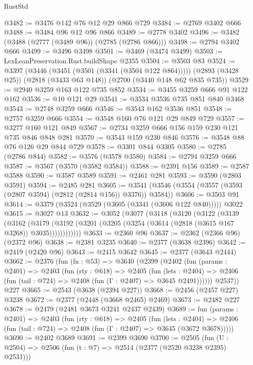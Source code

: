 \begin{lexlean}{RustStd}
\begin{coremodule}
@3482 := @3476 @142 @76 @12 @29 @866 @729
@3484 := @2769 @3402 @666
@3488 := @3484 @96 @12 @96 @866
@3489 := @2778 @3402
@3496 := @3482 (@3488 (@2777 (@3489 @96)) (@2785 (@2786 @866)))
@3498 := @2794 @3402 @666
@3499 := @3496 @3498
@3501 := @3469 (@3474 @3499)
@3503 := LexLeanPreservation.Rust.buildShape @2355
@3504 := @3503 @83
@3524 := @3397
    (@3446 (@3451 (@3501 (@3341 (@3504 @122 @864)))))
    (@2893 (@3428 @25))
    (@2818 (@3433 @63 @148))
    (@2700 (@3440 @148 @62 @835 @735))
@3529 := @2940 @3259 @163 @122 @735 @852
@3534 := @3455 @3259 @666 @91 @122 @162
@3536 := @10 @121 @29
@3541 := @3534 @3536 @735 @851 @840 @3468
@3543 := @2748 @3259 @666
@3546 := @3543 @162 @3536 @851
@3548 := @2757 @3259 @666
@3554 := @3548 @160 @76 @121 @29 @849 @729
@3557 := @3277 @160 @121 @849
@3567 := @2734 @3259 @666 @156 @159 @230 @121 @735 @846 @848 @281
@3570 := @3543 @159 @230 @846
@3576 := @3548 @88 @76 @126 @29 @844 @729
@3578 := @3301 @844 @3305
@3580 := @2785 (@2786 @844)
@3582 := @3576 (@3578 @3580)
@3584 := @2794 @3259 @666
@3587 := @3567 (@3570 (@3582 @3584))
@3588 := @2391 @156
@3589 := @2587 @3588
@3590 := @3587 @3589
@3591 := @2461 @281
@3593 := @3590 (@2803 @3591)
@3594 := @2485 @281
@3605 := @3541 (@3546 (@3554 (@3557 (@3593 (@2807 @3594) (@2812 (@2814 @156)) @3376)) @3584))
@3606 := @3503 @91
@3614 := @3379 (@3524 (@3529 (@3605 (@3341 (@3606 @122 @840))))) @3022
@3615 := @3027 @13
@3632 := @3052
    (@3077
      (@3118
        (@3120
          (@3122
            (@3139
              (@3162
                (@3179
                  (@3192 (@3201 (@3205 (@3254 (@3614 (@2818 (@3615 @167 @3268)) @3035))))))))))))
@3633 := @2360 @96
@3637 := @2362 (@2366 @96) (@2372 @96)
@3638 := @2381 @3235
@3640 := @2377 (@3638 @2396)
@3642 := @2419 (@2420 @96)
@3643 := @2415 @3642
@3645 := @2377 (@3643 @2444)
@3662 := @2376
    (fun (fn : @53) =>
    @3640
      (@2399
        (@2402
          (fun (params : @2401) =>
          @2403
            (fun (rty : @618) =>
            @2405
              (fun (lets : @2404) =>
              @2406 (fun (tail : @724) => @2408 (fun (Γ : @2407) => @3645 @2491))))))
        @2537))
    @227
@3665 := @2543 (@3638 (@2394 @227))
@3668 := @2456 (@2457 @227) @3238
@3672 := @2377 (@2448 (@3668 @2465) @2469)
@3673 := @2482 @227
@3678 := @2479 (@2481 @3673 @3241 @2437 @2439)
@3689 := fun (params : @2401) =>
  @2403
    (fun (rty : @618) =>
    @2405
      (fun (lets : @2404) =>
      @2406 (fun (tail : @724) => @2408 (fun (Γ : @2407) => @3645 (@3672 @3678)))))
@3690 := @2402 @3689
@3691 := @2399 @3690
@3700 := @2505 (fun (U : @2504) => @2506 (fun (t : @7) => @2514 (@2377 (@2520 @3238 @2395) @2531)))

\end{coremodule}
\end{lexlean}
